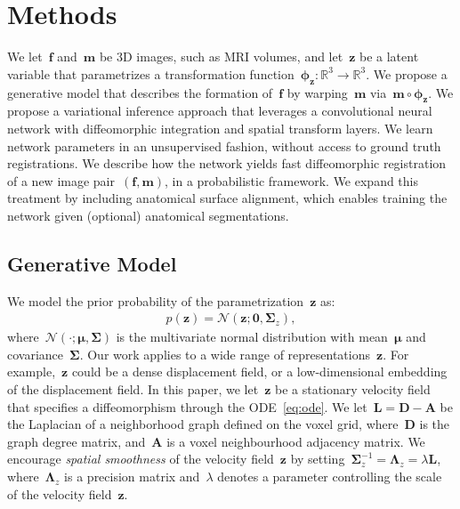 \documentclass{article}
\newcommand{\bD}{\boldsymbol{D}}
\newcommand{\bL}{\boldsymbol{L}}
\newcommand{\bA}{\boldsymbol{A}}
\newcommand{\bmu}{\boldsymbol{\mu}}
\newcommand{\bphi}{\boldsymbol{\phi}}
\newcommand{\bSigma}{\boldsymbol{\Sigma}}
\newcommand{\bLambda}{\boldsymbol{\Lambda}}
\newcommand{\bz}{\boldsymbol{z}}
\newcommand{\bmoving}{\boldsymbol{m}}
\newcommand{\bfixed}{\boldsymbol{f}}
\begin{document}
 

\vspace{-0.1cm}
\section{Methods}
\label{sec:model}



We let~$\bfixed$ and~$\bmoving$ be 3D images, such as MRI volumes,   and let~$\bz$ be a latent variable that parametrizes a transformation function~$\bphi_{\bz}: \mathbb{R}^3 \rightarrow \mathbb{R}^3$. We propose a generative model that describes the formation of~$\bfixed$ by warping~$\bmoving$ via~$\bmoving \circ \bphi_{\bz}$. 
We propose a variational inference approach that leverages a convolutional neural network with diffeomorphic integration and spatial transform layers. We learn network parameters in an unsupervised fashion, without access to ground truth registrations. We describe how the network yields fast diffeomorphic registration of a new image pair~$(\bfixed,\bmoving)$, in a probabilistic framework. We expand this treatment by including anatomical surface alignment, which enables training the network given (optional) anatomical segmentations.

\subsection{Generative Model}



We model the prior probability of the parametrization~$\bz$ as:
\begin{align}
p(\bz) = \mathcal{N}(\bz; \boldsymbol{0}, \bSigma_z),  \end{align}
where~$\mathcal{N}(\cdot;\bmu,\bSigma)$ is the multivariate normal distribution with mean~$\bmu$ and covariance~$\bSigma$. 
Our work applies to a wide range of representations~$\bz$. 
For example,~$\bz$ could be a dense displacement field, or a low-dimensional embedding of the displacement field. In this paper, we let~$\bz$ be a stationary velocity field that specifies a diffeomorphism through the ODE~\eqref{eq:ode}. We let~$\bL = \bD - \bA$ be the Laplacian of a neighborhood graph defined on the voxel grid, where~$\bD$ is the graph degree matrix, and~$\bA$ is a voxel neighbourhood adjacency matrix. We encourage \textit{spatial smoothness} of the velocity field~$\bz$ by setting~$\bSigma_z^{-1} = \bLambda_z = \lambda \bL$, where~$\bLambda_z$ is a precision matrix and~$\lambda$ denotes a parameter controlling the scale of the velocity field~$\bz$.
\end{document}
